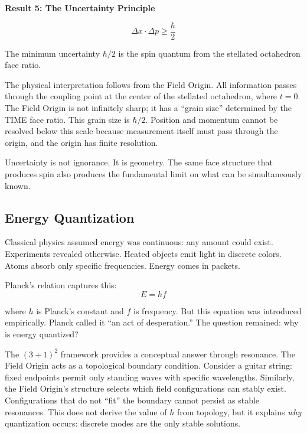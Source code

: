 \documentclass[aps,prd,preprint,superscriptaddress,showpacs,preprintnumbers,amsmath,amssymb,nofootinbib]{revtex4-2}
\begin{document}
\vspace{1.5em}
\noindent
\colorbox{resultgreen}{\parbox{\dimexpr\textwidth-2\fboxsep\relax}{%
\vspace{0.8em}
\centering
\textbf{\large Result 5: The Uncertainty Principle}

\vspace{0.5em}
\boldmath
\begin{equation}
\Delta x \cdot \Delta p \geq \frac{\hbar}{2}
\end{equation}
\unboldmath

\vspace{0.3em}
The minimum uncertainty $\hbar/2$ is the spin quantum from the stellated octahedron face ratio.
\vspace{0.5em}
}}
\vspace{1cm}

The physical interpretation follows from the Field Origin. All information passes through the coupling point at the center of the stellated octahedron, where $t = 0$. The Field Origin is not infinitely sharp; it has a ``grain size'' determined by the TIME face ratio. This grain size is $\hbar/2$. Position and momentum cannot be resolved below this scale because measurement itself must pass through the origin, and the origin has finite resolution.

Uncertainty is not ignorance. It is geometry. The same face structure that produces spin also produces the fundamental limit on what can be simultaneously known.

\subsection{Energy Quantization}
\label{subsec:quantization}

Classical physics assumed energy was continuous: any amount could exist. Experiments revealed otherwise. Heated objects emit light in discrete colors. Atoms absorb only specific frequencies. Energy comes in packets.

Planck's relation captures this:
\begin{equation}
E = hf
\end{equation}

where $h$ is Planck's constant and $f$ is frequency. But this equation was introduced empirically. Planck called it ``an act of desperation.'' The question remained: why is energy quantized?

The $(3+1)^2$ framework provides a conceptual answer through resonance. The Field Origin acts as a topological boundary condition. Consider a guitar string: fixed endpoints permit only standing waves with specific wavelengths. Similarly, the Field Origin's structure selects which field configurations can stably exist. Configurations that do not ``fit'' the boundary cannot persist as stable resonances. This does not derive the value of $h$ from topology, but it explains \emph{why} quantization occurs: discrete modes are the only stable solutions.
\end{document}
